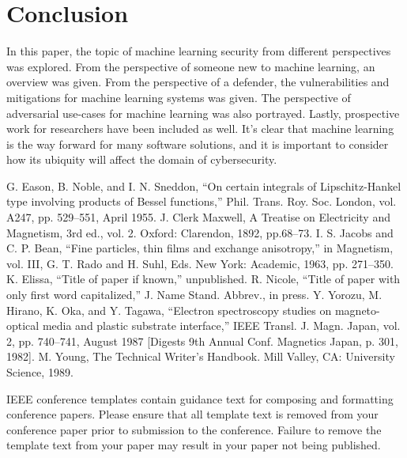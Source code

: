 \documentclass[11pt,conference]{IEEEtran}
\begin{document}
\section{Conclusion}
In this paper, the topic of machine learning security from different
perspectives was explored. From the perspective of someone new to machine
learning, an overview was given. From the perspective of a defender, the
vulnerabilities and mitigations for machine learning systems was given. The
perspective of adversarial use-cases for machine learning was also portrayed. Lastly,
prospective work for researchers have been included as well. It's clear that
machine learning is the way forward for many software solutions, and it is
important to consider how its ubiquity will affect the domain of cybersecurity. 


\begin{thebibliography}{00}
 G. Eason, B. Noble, and I. N. Sneddon, ``On certain integrals of Lipschitz-Hankel type involving products of Bessel functions,'' Phil. Trans. Roy. Soc. London, vol. A247, pp. 529--551, April 1955.
 J. Clerk Maxwell, A Treatise on Electricity and Magnetism, 3rd ed., vol. 2. Oxford: Clarendon, 1892, pp.68--73.
 I. S. Jacobs and C. P. Bean, ``Fine particles, thin films and exchange anisotropy,'' in Magnetism, vol. III, G. T. Rado and H. Suhl, Eds. New York: Academic, 1963, pp. 271--350.
 K. Elissa, ``Title of paper if known,'' unpublished.
 R. Nicole, ``Title of paper with only first word capitalized,'' J. Name Stand. Abbrev., in press.
 Y. Yorozu, M. Hirano, K. Oka, and Y. Tagawa, ``Electron spectroscopy studies on magneto-optical media and plastic substrate interface,'' IEEE Transl. J. Magn. Japan, vol. 2, pp. 740--741, August 1987 [Digests 9th Annual Conf. Magnetics Japan, p. 301, 1982].
 M. Young, The Technical Writer's Handbook. Mill Valley, CA: University Science, 1989.
\end{thebibliography}
\vspace{12pt}
\color{red}
IEEE conference templates contain guidance text for composing and formatting conference papers. Please ensure that all template text is removed from your conference paper prior to submission to the conference. Failure to remove the template text from your paper may result in your paper not being published.
\end{document}
